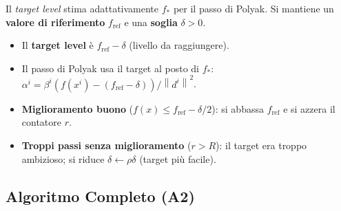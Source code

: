 \documentclass[11pt,a4paper]{article}
\theoremstyle{definition}
\theoremstyle{plain}
\theoremstyle{remark}
\newcommand{\norm}[1]{\left\| #1 \right\|}
\begin{document}
Il \emph{target level} stima adattativamente $f_*$ per il passo di Polyak.
Si mantiene un \textbf{valore di riferimento} $f_{\text{ref}}$ e una \textbf{soglia} $\delta > 0$.

\begin{keybox}
  \begin{itemize}[noitemsep]
    \item Il \textbf{target level} è $f_{\text{ref}} - \delta$ (livello da raggiungere).
    \item Il passo di Polyak usa il target al posto di $f_*$:
      $\alpha^i = \beta^i (f(x^i) - (f_{\text{ref}} - \delta)) / \norm{d^i}^2$.
    \item \textbf{Miglioramento buono} ($f(x) \leq f_{\text{ref}} - \delta/2$):
      si abbassa $f_{\text{ref}}$ e si azzera il contatore $r$.
    \item \textbf{Troppi passi senza miglioramento} ($r > R$):
      il target era troppo ambizioso; si riduce $\delta \leftarrow \rho\delta$ (target più facile).
  \end{itemize}
\end{keybox}

\subsection{Algoritmo Completo (A2)}
\end{document}
